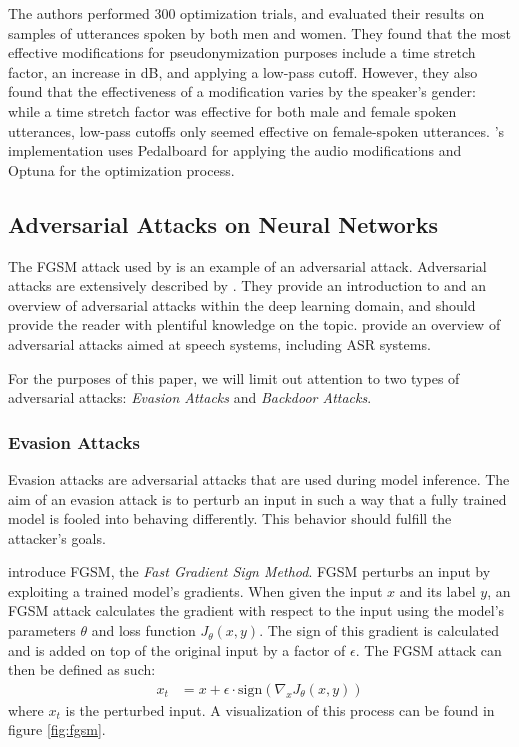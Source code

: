 \documentclass[11pt]{article}
\begin{document}
The authors performed 300 optimization trials, and evaluated their results on samples of utterances spoken by both men and women.
They found that the most effective modifications for pseudonymization purposes include a time stretch factor, an increase in dB, and applying a low-pass cutoff.
However, they also found that the effectiveness of a modification varies by the speaker's gender: while a time stretch factor was effective for both male and female spoken utterances, low-pass cutoffs only seemed effective on female-spoken utterances.
\citeauthor{roddeman2024anonymization}'s implementation uses Pedalboard \citep{sobot2021pedalboard} for applying the audio modifications and Optuna \citep{akiba2019optuna} for the optimization process.

\subsection{Adversarial Attacks on Neural Networks}
The FGSM attack used by \citet{shihao2024adversarial} is an example of an adversarial attack.
Adversarial attacks are extensively described by \citet{xiaoyong2019adversarial}.
They provide an introduction to and an overview of adversarial attacks within the deep learning domain, and should provide the reader with plentiful knowledge on the topic.
\citet{chen2022survey} provide an overview of adversarial attacks aimed at speech systems, including ASR systems.

For the purposes of this paper, we will limit out attention to two types of adversarial attacks: \textit{Evasion Attacks} and \textit{Backdoor Attacks}.

\subsubsection{Evasion Attacks}
Evasion attacks are adversarial attacks that are used during model inference.
The aim of an evasion attack is to perturb an input in such a way that a fully trained model is fooled into behaving differently.
This behavior should fulfill the attacker's goals.

\citet{goodfellow2015explaining} introduce FGSM, the \textit{Fast Gradient Sign Method}.
FGSM perturbs an input by exploiting a trained model's gradients.
When given the input $x$ and its label $y$, an FGSM attack calculates the gradient with respect to the input using the model's parameters $\theta$ and loss function $J_\theta(x, y)$.
The sign of this gradient is calculated and is added on top of the original input by a factor of $\epsilon$.
The FGSM attack can then be defined as such:
\begin{align*}
  x_t &= x + \epsilon \cdot \text{sign}(\nabla_x J_\theta(x, y))
\end{align*}
where $x_t$ is the perturbed input.
A visualization of this process can be found in figure \ref{fig:fgsm}.
\end{document}
